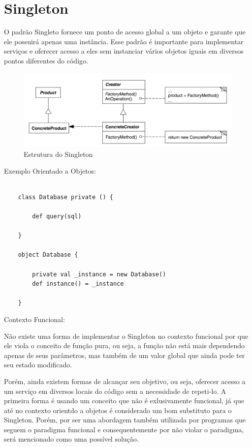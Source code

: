 \section{Singleton}

O padrão Singleto fornece um ponto de acesso global a um objeto 
e garante que ele possuirá apenas uma instância. Esse padrão 
é importante para implementar serviços e oferecer acesso a eles
sem instanciar vários objetos iguais em diversos pontos diferentes 
do código.


\begin{figure}[htb]
	\caption{\label{fig_grafico}Estrutura do Singleton}
	\begin{center}
	    \includegraphics[scale=0.5]{5_padroes-contexto-funcional/5.1_criacionais/5.1.1_factory-method/diagram.png}
	\end{center}
\end{figure}

Exemplo Orientado a Objetos:

\begin{lstlisting}[caption={Singleton Orientação a Objetos},label=oofactory]
    
    class Database private () {

        def query(sql)

    }

    object Database {

        private val _instance = new Database()
        def instance() = _instance

    }

\end{lstlisting}

Contexto Funcional:

Não existe uma forma de implementar o Singleton no contexto funcional 
por que ele viola o conceito de função pura, ou seja, a função não 
está mais dependendo apenas de seus parâmetros, mas também de um 
valor global que ainda pode ter seu estado modificado.

Porém, ainda existem formas de alcançar seu objetivo, ou seja, 
oferecer acesso a um serviço em diversos locais do código sem a necessidade 
de repeti-lo. A primeira forma é usando um conceito que não é exlusivamente funcional, 
já que até no contexto orientdo a objetos é considerado um bom substituto 
para o Singleton. Porém, por ser uma abordagem também utilizada por 
programas que seguem o paradigma funcional e consequentemente por não 
violar o paradigma, será mencionado como uma possível solução.

